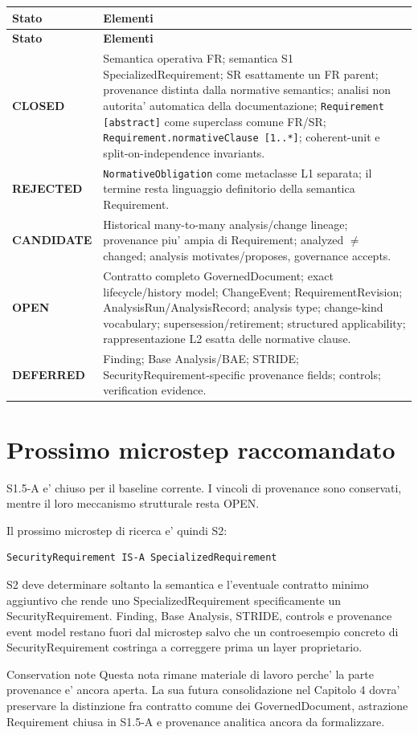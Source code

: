 \documentclass[11pt,a4paper]{article}
\newcommand{\closed}{\textbf{CLOSED}}
\newcommand{\candidate}{\textbf{CANDIDATE}}
\newcommand{\openstatus}{\textbf{OPEN}}
\newcommand{\deferred}{\textbf{DEFERRED}}
\begin{document}
\small
\begin{longtable}{p{}p{}}
\toprule
\textbf{Stato} & \textbf{Elementi} \\
\midrule
\endfirsthead
\toprule
\textbf{Stato} & \textbf{Elementi} \\
\midrule
\endhead
\closed & Semantica operativa FR; semantica S1 SpecializedRequirement; SR esattamente un FR parent; provenance distinta dalla normative semantics; analisi non autorita' automatica della documentazione; \texttt{Requirement [abstract]} come superclass comune FR/SR; \texttt{Requirement.normativeClause [1..*]}; coherent-unit e split-on-independence invariants. \\
\addlinespace
\textbf{REJECTED} & \texttt{NormativeObligation} come metaclasse L1 separata; il termine resta linguaggio definitorio della semantica Requirement. \\
\addlinespace
\candidate & Historical many-to-many analysis/change lineage; provenance piu' ampia di Requirement; analyzed $\neq$ changed; analysis motivates/proposes, governance accepts. \\
\addlinespace
\openstatus & Contratto completo GovernedDocument; exact lifecycle/history model; ChangeEvent; RequirementRevision; AnalysisRun/AnalysisRecord; analysis type; change-kind vocabulary; supersession/retirement; structured applicability; rappresentazione L2 esatta delle normative clause. \\
\addlinespace
\deferred & Finding; Base Analysis/BAE; STRIDE; SecurityRequirement-specific provenance fields; controls; verification evidence. \\
\bottomrule
\end{longtable}
\normalsize

\section{Prossimo microstep raccomandato}

S1.5-A e' chiuso per il baseline corrente. I vincoli di provenance sono conservati, mentre il loro meccanismo strutturale resta OPEN.

Il prossimo microstep di ricerca e' quindi S2:

\begin{lstlisting}
SecurityRequirement IS-A SpecializedRequirement
\end{lstlisting}

S2 deve determinare soltanto la semantica e l'eventuale contratto minimo aggiuntivo che rende uno SpecializedRequirement specificamente un SecurityRequirement. Finding, Base Analysis, STRIDE, controls e provenance event model restano fuori dal microstep salvo che un controesempio concreto di SecurityRequirement costringa a correggere prima un layer proprietario.

\begin{statusbox}{Conservation note}
Questa nota rimane materiale di lavoro perche' la parte provenance e' ancora aperta. La sua futura consolidazione nel Capitolo 4 dovra' preservare la distinzione fra contratto comune dei GovernedDocument, astrazione Requirement chiusa in S1.5-A e provenance analitica ancora da formalizzare.
\end{statusbox}
\end{document}
